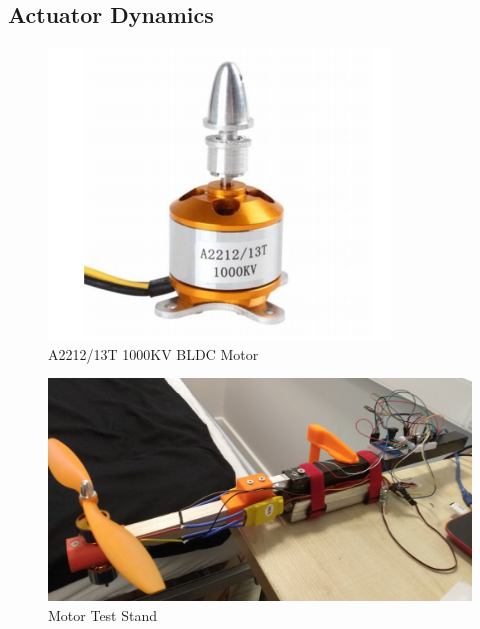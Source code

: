 \documentclass[12pt,a4paper,twoside]{report}
\begin{document}
			\subsection{Actuator Dynamics}
			
				\begin{figure}[h!]
					\centering
					\includegraphics[width=0.4\linewidth]{BLDC.png}
					\caption{A2212/13T 1000KV BLDC Motor}
					\label{fig:BLDC}
				\end{figure}
				
				\begin{figure}[h!]
					\centering
					\includegraphics[width=0.5\linewidth]{TestStand1.jpg}
					\caption{Motor Test Stand}
					\label{fig:motorteststand}
				\end{figure}
				
\end{document}
